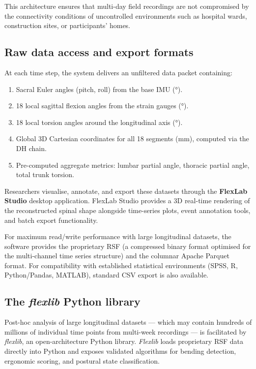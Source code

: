 This architecture ensures that multi-day field recordings are not compromised by
the connectivity conditions of uncontrolled environments such as hospital wards,
construction sites, or participants' homes.

\subsection{Raw data access and export formats}

At each time step, the system delivers an unfiltered data packet containing:

\begin{enumerate}
	\item Sacral Euler angles (pitch, roll) from the base \acs{IMU} (\si{\degree}).
	\item 18 local sagittal flexion angles from the strain gauges (\si{\degree}).
	\item 18 local torsion angles around the longitudinal axis (\si{\degree}).
	\item Global 3D Cartesian coordinates for all 18 segments (mm), computed via the
	      \ac{DH} chain.
	\item Pre-computed aggregate metrics: lumbar partial angle, thoracic partial angle,
	      total trunk torsion.
\end{enumerate}

Researchers visualise, annotate, and export these datasets through the
\textbf{FlexLab Studio} desktop application.
FlexLab Studio provides a 3D real-time rendering of the reconstructed spinal shape
alongside time-series plots, event annotation tools, and batch export functionality.

For maximum read/write performance with large longitudinal datasets, the software
provides the proprietary \acf{RSF} (a compressed binary format optimised for the
multi-channel time series structure) and the columnar Apache Parquet format.
For compatibility with established statistical environments (SPSS, R, Python/Pandas,
MATLAB), standard CSV export is also available.

\subsection{The \emph{flexlib} Python library}

Post-hoc analysis of large longitudinal datasets --- which may contain hundreds of
millions of individual time points from multi-week recordings --- is facilitated by
\emph{flexlib}, an open-architecture Python library.
\emph{Flexlib} loads proprietary \acs{RSF} data directly into Python and exposes
validated algorithms for bending detection, ergonomic scoring, and postural
state classification.

